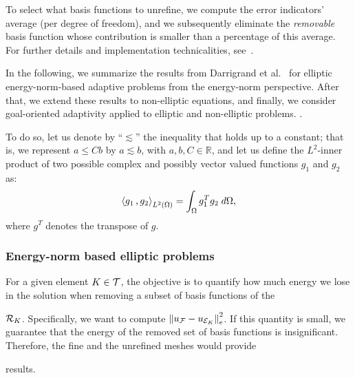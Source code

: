 {{{To select what basis functions to unrefine, we compute the error indicators' average (per degree of freedom), and we subsequently eliminate the \emph{removable} basis function whose contribution is smaller than a percentage of this average. For further details and implementation technicalities, see~\cite{darrigrand2020painless}}.

In the following, we summarize the results from Darrigrand et al.~\cite{darrigrand2020painless} for elliptic energy-norm-based adaptive problems from the energy-norm perspective. After that, we extend these results to non-elliptic equations, and finally, we consider goal-oriented adaptivity applied to elliptic and non-elliptic problems. . 

To do so, let us denote by \enquote{$\lesssim$} the inequality that holds up to a constant; that is, we represent $a\leq Cb$ by $a\lesssim b$, with $a,b,C \in \mathbb{R}$, and let us define the $L^2$-inner product of two possible complex and possibly vector valued functions $g_1$ and $g_2$ as:
\begin{equation}
 \left< g_1\,,g_2\right>_{L^2(\Omega)} = \int_\Omega{g_1^Tg_2 \; d\Omega},
 \label{eq:inner_product}
\end{equation}
where $g^T$ denotes the transpose of  $g$.  

\subsubsection{Energy-norm based elliptic problems}

For a given element $K \in \mathcal{T}$, the objective is to quantify how much energy we lose in the solution when removing a subset of basis functions of the { $\mathcal{R}_K$. Specifically, we want to compute $\left\|u_{\mathcal{F}} - u_{\mathcal{E}_K}\right\|_e^2$. If this quantity is small, we guarantee that the energy of the removed set of basis functions is insignificant. Therefore, the fine and the unrefined meshes would provide { results.

}}}}

